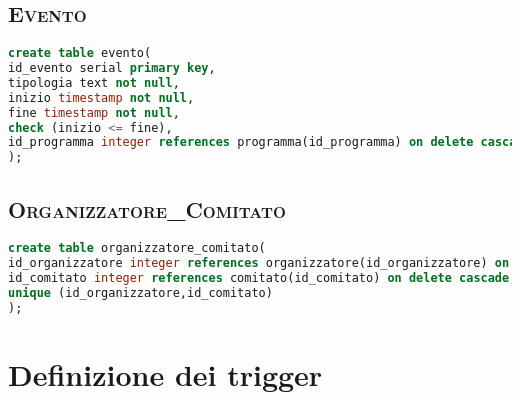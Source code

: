 \subsection{\textsc{Evento}}
\begin{lstlisting}[language=SQL,style=mystyle]
create table evento(
id_evento serial primary key,
tipologia text not null,
inizio timestamp not null,
fine timestamp not null,
check (inizio <= fine), 
id_programma integer references programma(id_programma) on delete cascade not null
);
\end{lstlisting}
\subsection{\textsc{Organizzatore\_Comitato}}
\begin{lstlisting}[language=SQL,style=mystyle]
create table organizzatore_comitato(
id_organizzatore integer references organizzatore(id_organizzatore) on delete cascade,
id_comitato integer references comitato(id_comitato) on delete cascade,
unique (id_organizzatore,id_comitato) 
);
\end{lstlisting}
\section{Definizione dei trigger}
